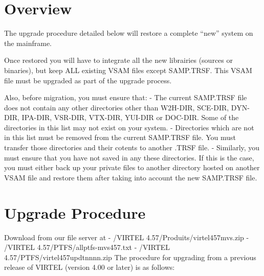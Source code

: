 \documentclass[letterpaper,10pt,english]{sphinxmanual}
\begin{document}
\section{Overview}
\label{\detokenize{Migration_Guide:overview}}
The upgrade procedure detailed below will restore a complete “new” system on the mainframe.

Once restored you will have to integrate all the new librairies (sources or binaries), but keep ALL existing VSAM files except SAMP.TRSF. This VSAM file must be upgraded as part of the upgrade process.

Also, before migration, you must ensure that:
- The current SAMP.TRSF file does not contain any other directories other than W2H-DIR, SCE-DIR, DYN-DIR, IPA-DIR, VSR-DIR, VTX-DIR, YUI-DIR or DOC-DIR. Some of the directories in this list may not exist on your system.
- Directories which are not in this list must be removed from the current SAMP.TRSF file. You must transfer those directories and their cotents to another .TRSF file.
- Similarly, you must ensure that you have not saved in any these directories. If this is the case, you must either back up your private files to another directory hosted on another VSAM file and restore them after taking into account the new SAMP.TRSF file.

\newpage


\section{Upgrade Procedure}
\label{\detokenize{Migration_Guide:upgrade-procedure}}\label{\detokenize{Migration_Guide:index-1}}
Download from our file server at 
- /VIRTEL 4.57/Produits/virtel457mvs.zip
- /VIRTEL 4.57/PTFS/allptfs-mvs457.txt
- /VIRTEL 4.57/PTFS/virtel457updtnnnn.zip
The procedure for upgrading from a previous release of VIRTEL (version 4.00 or later) is as follows:
\end{document}
